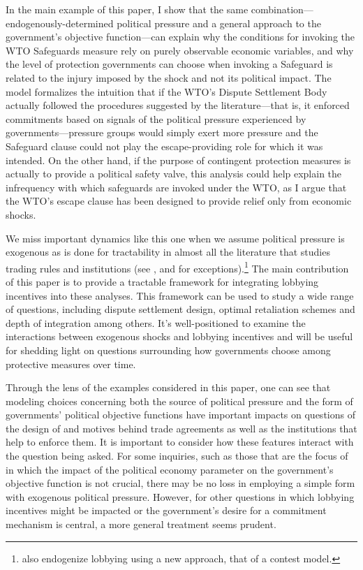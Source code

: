 In the main example of this paper, I show that the same combination---endogenously-determined political pressure and a general approach to the government's objective function---can explain why the conditions for invoking the WTO Safeguards measure rely on purely observable economic variables, and why the level of protection governments can choose when invoking a Safeguard is related to the injury imposed by the shock and not its political impact. The model formalizes the intuition that if the WTO's Dispute Settlement Body actually followed the procedures suggested by the literature---that is, it enforced commitments based on signals of the political pressure experienced by governments---pressure groups would simply exert more pressure and the Safeguard clause could not play the escape-providing role for which it was intended. On the other hand, if the purpose of contingent protection measures is actually to provide a political safety valve, this analysis could help explain the infrequency with which safeguards are invoked under the WTO, as I argue that the WTO's escape clause has been designed to provide relief only from economic shocks.

We miss important dynamics like this one when we assume political pressure is exogenous as is done for tractability in almost all the literature that studies trading rules and institutions (see \Textcite{mrc2007}, \Textcite{lt} and \Textcite{buzard2013a} for exceptions).\footnote{\Textcite{clz} also endogenize lobbying using a new approach, that of a contest model.} The main contribution of this paper is to provide a tractable framework for integrating lobbying incentives into these analyses. This framework can be used to study a wide range of questions, including dispute settlement design, optimal retaliation schemes and depth of integration among others. It's well-positioned to examine the interactions between exogenous shocks and lobbying incentives and will be useful for shedding light on questions surrounding how governments choose among protective measures over time.

Through the lens of the examples considered in this paper, one can see that modeling choices concerning both the source of political pressure and the form of governments' political objective functions have important impacts on questions of the design of and motives behind trade agreements as well as the institutions that help to enforce them. It is important to consider how these features interact with the question being asked. For some inquiries, such as those that are the focus of \Textcite{ms2011, ms2012a} in which the impact of the political economy parameter on the government's objective function is not crucial, there may be no loss in employing a simple form with exogenous political pressure. However, for other questions in which lobbying incentives might be impacted or the government's desire for a commitment mechanism is central, a more general treatment seems prudent.

